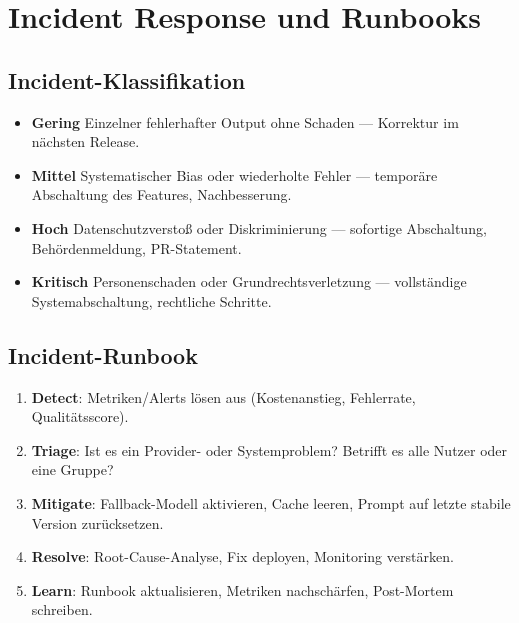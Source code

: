 \section{Incident Response und Runbooks}

\subsection{Incident-Klassifikation}

\begin{itemize}

     \item \textbf{Gering} Einzelner fehlerhafter Output ohne Schaden --- Korrektur im nächsten Release.
     \item \textbf{Mittel} Systematischer Bias oder wiederholte Fehler --- temporäre Abschaltung des Features, Nachbesserung.
     \item \textbf{Hoch} Datenschutzverstoß oder Diskriminierung --- sofortige Abschaltung, Behördenmeldung, PR-Statement.
     \item \textbf{Kritisch} Personenschaden oder Grundrechtsverletzung --- vollständige Systemabschaltung, rechtliche Schritte.
\end{itemize}

\subsection{Incident-Runbook}

\begin{enumerate}[leftmargin=*]
     \item \textbf{Detect}: Metriken/Alerts lösen aus (Kostenanstieg, Fehlerrate, Qualitätsscore).
     \item \textbf{Triage}: Ist es ein Provider- oder Systemproblem? Betrifft es alle Nutzer oder eine Gruppe?
     \item \textbf{Mitigate}: Fallback-Modell aktivieren, Cache leeren, Prompt auf letzte stabile Version zurücksetzen.
     \item \textbf{Resolve}: Root-Cause-Analyse, Fix deployen, Monitoring verstärken.
     \item \textbf{Learn}: Runbook aktualisieren, Metriken nachschärfen, Post-Mortem schreiben.
\end{enumerate}


